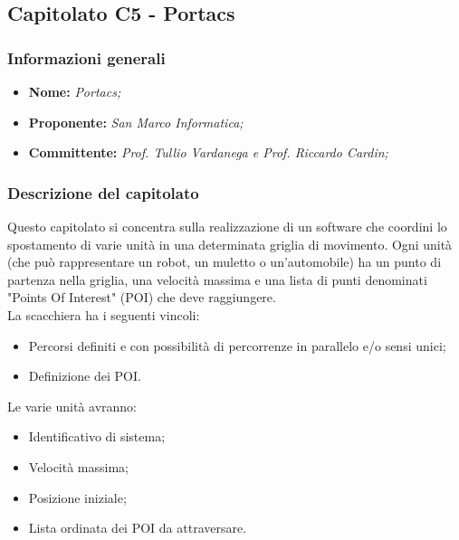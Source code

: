 \subsection{Capitolato C5 - Portacs}
\subsubsection{Informazioni generali}
	\begin{itemize}
	\item \textbf{Nome:} \textit{Portacs;}
	\item \textbf{Proponente:} \textit{San Marco Informatica;}
	\item \textbf{Committente:}  \textit{Prof. Tullio Vardanega e Prof. Riccardo Cardin;}
	\end{itemize}
\subsubsection{Descrizione del capitolato}
Questo capitolato si concentra sulla realizzazione di un software che coordini lo spostamento di varie unità in una determinata griglia di movimento.
Ogni unità (che può rappresentare un robot, un muletto o un'automobile) ha un punto di partenza nella griglia, una velocità massima e una lista di punti denominati "Points Of Interest" (POI) che deve raggiungere.\\
La scacchiera ha i seguenti vincoli:
\begin{itemize}
	\item Percorsi definiti e con possibilità di percorrenze in parallelo e/o sensi unici;
	\item Definizione dei POI.
\end{itemize}
Le varie unità avranno:
\begin{itemize}
	\item Identificativo di sistema;
	\item Velocità massima;
	\item Posizione iniziale;
	\item Lista ordinata dei POI da attraversare.
\end{itemize}

